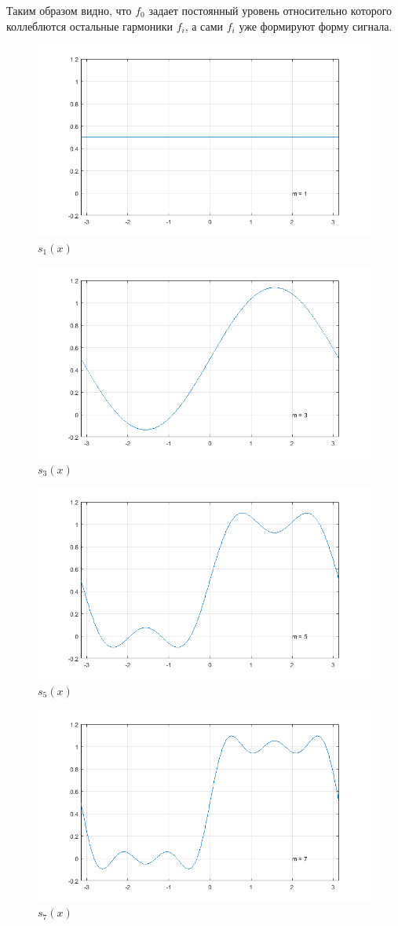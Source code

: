 Таким образом видно, что $f_0$ задает постоянный уровень относительно
которого коллеблются остальные гармоники $f_i$, а сами $f_i$ уже формируют
форму сигнала.

\begin{figure}[H]
	\centering
	\includegraphics[width=0.5\linewidth]{AfanasyevMM/img/s(x)_m1}
	\caption{$s_{1}(x)$}
	\label{fig:AfanasyevMM.s(x)_m1}
\end{figure}
\begin{figure}[H]
	\centering
	\includegraphics[width=0.5\linewidth]{AfanasyevMM/img/s(x)_m3}
	\caption{$s_{3}(x)$}
	\label{fig:AfanasyevMM.s(x)_m3}
\end{figure}
\begin{figure}[H]
	\centering
	\includegraphics[width=0.5\linewidth]{AfanasyevMM/img/s(x)_m5}
	\caption{$s_{5}(x)$}
	\label{fig:AfanasyevMM.s(x)_m5}
\end{figure}
\begin{figure}[H]
	\centering
	\includegraphics[width=0.5\linewidth]{AfanasyevMM/img/s(x)_m7}
	\caption{$s_{7}(x)$}
	\label{fig:AfanasyevMM.s(x)_m7}
\end{figure}
